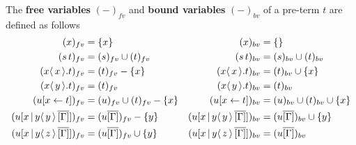 \documentclass[runningheads]{llncs}
\let\vec\relax
\newcommand\defn{\textbf}
\newcommand{\fv}[1]{(#1)_{fv}}
\newcommand{\bv}[1]{(#1)_{bv}}
\newcommand{\set}[1]{ \{ #1 \} }
\newcommand{\app}[2]{#1 \, #2}
\newcommand{\fake}[3]{#1 \langle \, #2 \, \rangle . #3}
\newcommand{\share}[3]{#1 [#2 \leftarrow #3]}
\newcommand{\dist}[5]{#1 [ #2 \, \vert \, \fakedist{#4}{#5} \, #3 ]}
\newcommand{\fakedist}[2]{#1 \langle \, #2 \, \rangle}
\newcommand\vecdist[2]{\vec{#2}}
\begin{document}
\begin{definition}
\label{def:freeboundvar} The \defn{free variables} $\fv{-}$ and \defn{bound variables} $\bv{-}$ of a pre-term $t$ are defined as follows
\begingroup
\allowdisplaybreaks
	\begin{align*}
		\fv{x} &= \set{x} & \bv{x} &= \set{} \\
		\fv{\app{s}{t}} &= \fv{s} \cup \fv{t} & \bv{\app{s}{t}} &= \bv{s} \cup \bv{t} \\
		\fv{\fake{x}{x}{t}} &= \fv{t} - \set{x} & \bv{\fake{x}{x}{t}} &= \bv{t} \cup \set{x} \\
		\fv{\fake{x}{\vec{y}}{t}} &= \fv{t} & \bv{\fake{x}{\vec{y}}{t}} &= \bv{t} \\
		\fv{\share{u}{\vec{x}}{t}} &= \fv{u} \cup \fv{t} - \set{\vec{x}} & \bv{\share{u}{\vec{x}}{t}} &= \bv{u} \cup \bv{t} \cup \set{\vec{x}} \\
		\fv{\dist{u}{\vecdist{e}{x}}{\overline{[\Gamma]}}{y}{y}} &= \fv{u \overline{[\Gamma]}} - \set{y} 
	  & \bv{\dist{u}{\vecdist{e}{x}}{\overline{[\Gamma]}}{y}{y}} &= \bv{u \overline{[\Gamma]}} \cup{\set y}\\
	  	\fv{\dist{u}{\vecdist{e}{x}}{\overline{[\Gamma]}}{y}{\vec z}} &= \fv{u \overline{[\Gamma]}} \cup \set{y} 
	  & \bv{\dist{u}{\vecdist{e}{x}}{\overline{[\Gamma]}}{y}{\vec z}} &= \bv{u \overline{[\Gamma]}}
	\end{align*}
\endgroup
\end{definition}
\end{document}
